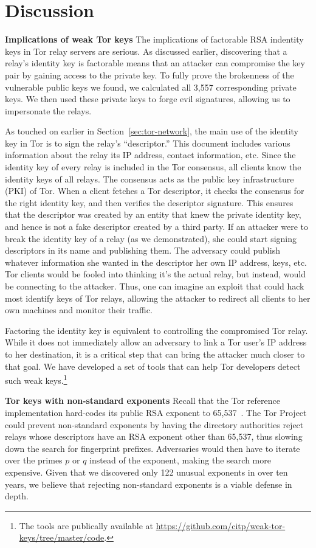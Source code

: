 \section{Discussion}
\label{sec:discussion}
\textbf{Implications of weak Tor keys}
The implications of factorable RSA indentity keys in Tor relay servers are
serious. As discussed earlier, discovering that a relay's identity key is
factorable means that an attacker can compromise the key pair by gaining access
to the private key. To fully prove the brokenness of the vulnerable public keys
we found, we calculated all 3,557 corresponding private keys. We then used these
private keys to forge evil signatures, allowing us to impersonate the relays.

As touched on earlier in Section~\ref{sec:tor-network}, the main use of the
identity key in Tor is to sign the relay's ``descriptor.'' This document
includes various information about the relay \eg its IP address, contact
information, etc. Since the identity key of every relay is included in the Tor
consensus, all clients know the identity keys of all relays. The consensus acts
as the public key infrastructure (PKI) of Tor. When a client fetches a Tor
descriptor, it checks the consensus for the right identity key, and then
verifies the descriptor signature. This ensures that the descriptor was created
by an entity that knew the private identity key, and hence is not a fake
descriptor created by a third party. If an attacker were to break the identity
key of a relay (as we demonstrated), she could start signing descriptors in its
name and publishing them. The adversary could publish whatever information she
wanted in the descriptor \eg her own IP address, keys, etc. Tor clients would be
fooled into thinking it's the actual relay, but instead, would be connecting to
the attacker. Thus, one can imagine an exploit that could hack most identify
keys of Tor relays, allowing the attacker to redirect all clients to her own
machines and monitor their traffic.

Factoring the identity key is equivalent to controlling the compromised Tor
relay. While it does not immediately allow an adversary to link a Tor user's IP
address to her destination, it is a critical step that can bring the attacker
much closer to that goal. We have developed a set of tools that can help Tor
developers detect such weak keys.\footnote{The tools are publically available at
\url{https://github.com/citp/weak-tor-keys/tree/master/code}.}

\textbf{Tor keys with non-standard exponents} Recall that the Tor reference
implementation hard-codes its public RSA exponent to
65,537~\cite[\S~0.3]{torspec}.  The Tor Project could prevent non-standard
exponents by having the directory authorities reject relays whose descriptors
have an RSA exponent other than 65,537, thus slowing down the search for
fingerprint prefixes.  Adversaries would then have to iterate over the primes
$p$ or $q$ instead of the exponent, making the search more expensive.  Given
that we discovered only 122 unusual exponents in over ten years, we believe that
rejecting non-standard exponents is a viable defense in depth.

